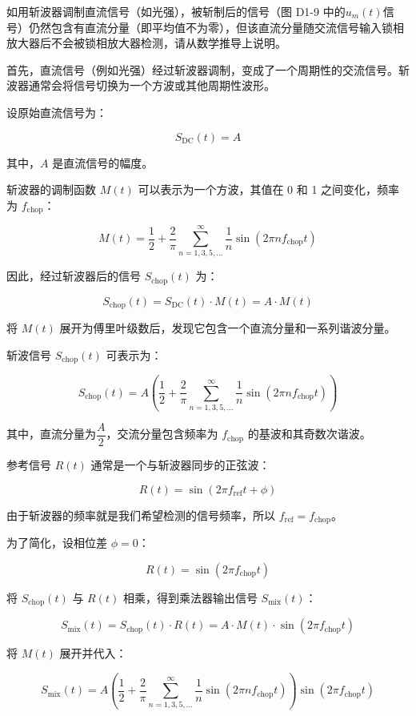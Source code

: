 \documentclass[dvipsnames, svgnames,a4paper,11pt]{article}
\begin{document}
\begin{question}
	如用斩波器调制直流信号（如光强），被斩制后的信号（图 D1-9 中的$u_m(t)$信号）仍然包含有直流分量（即平均值不为零），但该直流分量随交流信号输入锁相放大器后不会被锁相放大器检测，请从数学推导上说明。
\end{question}

首先，直流信号（例如光强）经过斩波器调制，变成了一个周期性的交流信号。斩波器通常会将信号切换为一个方波或其他周期性波形。

设原始直流信号为：

\[
S_{\text{DC}}(t) = A
\]

其中，\( A \) 是直流信号的幅度。

斩波器的调制函数 \( M(t) \) 可以表示为一个方波，其值在 0 和 1 之间变化，频率为 \( f_{\text{chop}} \)：

\[
M(t) = \dfrac{1}{2} + \dfrac{2}{\pi} \sum_{n=1,3,5,\dots}^{\infty} \dfrac{1}{n} \sin(2\pi n f_{\text{chop}} t)
\]

因此，经过斩波器后的信号 \( S_{\text{chop}}(t) \) 为：

\[
S_{\text{chop}}(t) = S_{\text{DC}}(t) \cdot M(t) = A \cdot M(t)
\]

将 \( M(t) \) 展开为傅里叶级数后，发现它包含一个直流分量和一系列谐波分量。

斩波信号 \( S_{\text{chop}}(t) \) 可表示为：

\[
S_{\text{chop}}(t) = A \left( \dfrac{1}{2} + \dfrac{2}{\pi} \sum_{n=1,3,5,\dots}^{\infty} \dfrac{1}{n} \sin(2\pi n f_{\text{chop}} t) \right)
\]

其中，直流分量为\( \dfrac{A}{2} \)，交流分量包含频率为 \( f_{\text{chop}} \) 的基波和其奇数次谐波。

参考信号 \( R(t) \) 通常是一个与斩波器同步的正弦波：

\[
R(t) = \sin(2\pi f_{\text{ref}} t + \phi)
\]

由于斩波器的频率就是我们希望检测的信号频率，所以 \( f_{\text{ref}} = f_{\text{chop}} \)。

为了简化，设相位差 \( \phi = 0 \)：

\[
R(t) = \sin(2\pi f_{\text{chop}} t)
\]

将 \( S_{\text{chop}}(t) \) 与 \( R(t) \) 相乘，得到乘法器输出信号 \( S_{\text{mix}}(t) \)：

\[
S_{\text{mix}}(t) = S_{\text{chop}}(t) \cdot R(t) = A \cdot M(t) \cdot \sin(2\pi f_{\text{chop}} t)
\]

将 \( M(t) \) 展开并代入：

\[
S_{\text{mix}}(t) = A \left( \dfrac{1}{2} + \dfrac{2}{\pi} \sum_{n=1,3,5,\dots}^{\infty} \dfrac{1}{n} \sin(2\pi n f_{\text{chop}} t) \right) \sin(2\pi f_{\text{chop}} t)
\]
\end{document}
